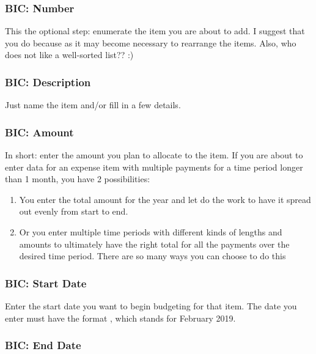 \subsubsection{BIC: Number}
\label{subsubsec:budgeting-item-column-number}

This the optional step: enumerate the item you are about to add.
I suggest that you do because as it may become necessary to rearrange the items.
Also, who does not like a well-sorted list?? :)

\subsubsection{BIC: Description}
\label{subsubsec:budgeting-item-column-description}

Just name the item and/or fill in a few details.

\subsubsection{BIC: Amount}
\label{subsubsec:budgeting-item-column-amount}

In short: enter the amount you plan to allocate to the item.
If you are about to enter data for an expense item with multiple payments for a time period longer than 1 month, you have 2 possibilities:
\begin{enumerate}
	\item You enter the total amount for the year and let \tfn do the work to have it spread out evenly from start to end.
	\item Or you enter multiple time periods with different kinds of lengths and amounts to ultimately have the right total for all the payments over the desired time period.
	There are so many ways you can choose to do this
\end{enumerate}

\subsubsection{BIC: Start Date}
\label{subsubsec:budgeting-item-column-start-date}

Enter the start date you want to begin budgeting for that item.
The date you enter must have the format , \eg {} which stands for February 2019.

\subsubsection{BIC: End Date}
\label{subsubsec:budgeting-item-column-end-date}

